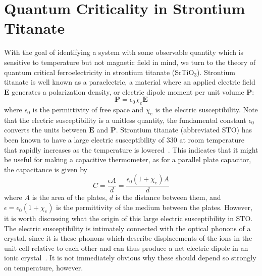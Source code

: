 \documentclass{thesis-umich}
\begin{document}
\section{Quantum Criticality in Strontium Titanate}

With the goal of identifying a system with some observable quantity which is sensitive to temperature but not magnetic field in mind, we turn to the theory of quantum critical ferroelectricity in strontium titanate (SrTiO$_3$). Strontium titanate is well known as a paraelectric, a material where an applied electric field $\mathbf{E}$ generates a polarization density, or electric dipole moment per unit volume $\mathbf{P}$:
\[ \mathbf{P} = \epsilon_0 \chi_e \mathbf{E} \]
where $\epsilon_0$ is the permittivity of free space and $\chi_e$ is the electric susceptibility. Note that the electric susceptibility is a unitless quantity, the fundamental constant $\epsilon_0$ converts the units between $\mathbf{E}$ and $\mathbf{P}$. Strontium titanate (abbreviated STO) has been known to have a large electric susceptibility of 330 at room temperature that rapidly increases as the temperature is lowered~\cite{Neville1972}. This indicates that it might be useful for making a capacitive thermometer, as for a parallel plate capacitor, the capacitance is given by
\[ C = \frac{\epsilon A}{d} = \frac{\epsilon_0(1+\chi_e)A}{d}\]
where $A$ is the area of the plates, $d$ is the distance between them, and $\epsilon = \epsilon_0 (1 + \chi_e)$ is the permittivity of the medium between the plates. However, it is worth discussing what the origin of this large electric susceptibility in STO. The electric susceptibility is intimately connected with the optical phonons of a crystal, since it is these phonons which describe displacements of the ions in the unit cell relative to each other and can thus produce a net electric dipole in an ionic crystal~\cite{AshcroftMermin}. It is not immediately obvious why these should depend so strongly on temperature, however.
\end{document}
